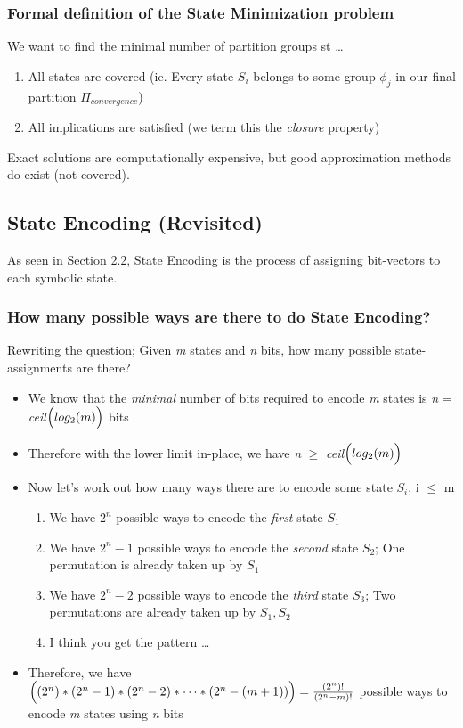 \documentclass{article}
\begin{document}
\subsubsection{Formal definition of the State Minimization problem}
We want to find the minimal number of partition groups st \dots
\begin{enumerate}
    \item All states are covered (ie. Every state $S_{i}$ belongs to some group $\phi_{j}$ in our final partition $\Pi_{convergence}$)
    \item All implications are satisfied (we term this the \textit{closure} property)
\end{enumerate}

Exact solutions are computationally expensive, but good approximation methods do exist (not covered).

\subsection{State Encoding (Revisited)}
As seen in Section 2.2, State Encoding is the process of assigning bit-vectors to each symbolic state.

\subsubsection{How many possible ways are there to do State Encoding?}
Rewriting the question; Given \textit{m} states and \textit{n} bits, how many possible state-assignments are there?
\begin{itemize}
    \item We know that the \textit{minimal} number of bits required to encode \textit{m} states is \textit{n} = \textit{ceil}$\Bigl( log_{2}(m) \Bigr)$ bits
    \item Therefore with the lower limit in-place, we have \textit{n} $\ge$ \textit{ceil}$\Bigl( log_{2}(m) \Bigr)$
    \item Now let's work out how many ways there are to encode some state $S_{i}$, i $\le$ m
    \begin{enumerate}
        \item We have $2^{n}$ possible ways to encode the \textit{first} state $S_{1}$
        \item We have $2^{n}-1$ possible ways to encode the \textit{second} state $S_{2}$; One permutation is already taken up by $S_{1}$
        \item We have $2^{n}-2$ possible ways to encode the \textit{third} state $S_{3}$; Two permutations are already taken up by $S_{1},S_{2}$
        \item I think you get the pattern \dots
    \end{enumerate}
    \item Therefore, we have $\Bigl( (2^{n}) * (2^{n}-1) * (2^{n}-2) * \dots * (2^{n}-(m+1)) \Bigr) = \frac{(2^{n})!}{(2^{n}-m)!}$ possible ways to encode \textit{m} states using \textit{n} bits
\end{itemize}
\end{document}
